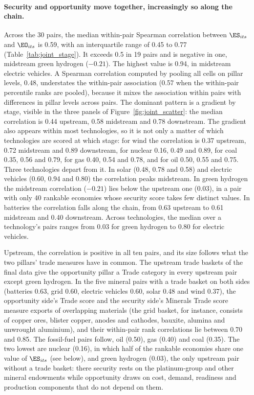 \paragraph{Security and opportunity move together, increasingly so along the chain.} Across the
30 pairs, the median within-pair Spearman correlation between $\ES_{its}$ and $\EO_{its}$ is
0.59, with an interquartile range of 0.45 to 0.77 (Table~\ref{tab:joint_stage}). It exceeds 0.5
in 19 pairs and is negative in one, midstream green hydrogen ($-0.21$). The highest value is
0.94, in midstream electric vehicles. A Spearman correlation computed by pooling all cells on
pillar levels, 0.48, understates the within-pair association (0.57 when the within-pair
percentile ranks are pooled), because it mixes the association within pairs with differences in
pillar levels across pairs. The dominant pattern is a gradient by stage, visible in the three
panels of Figure~\ref{fig:joint_scatter}: the median correlation is 0.44 upstream, 0.58
midstream and 0.78 downstream. The gradient also appears within most technologies, so it is not
only a matter of which technologies are scored at which stage: for wind the correlation is 0.37
upstream, 0.72 midstream and 0.89 downstream, for nuclear 0.16, 0.49 and 0.89, for coal 0.35,
0.56 and 0.79, for gas 0.40, 0.54 and 0.78, and for oil 0.50, 0.55 and 0.75. Three technologies
depart from it. In solar (0.48, 0.78 and 0.58) and electric vehicles (0.60, 0.94 and 0.80) the
correlation peaks midstream. In green hydrogen the midstream correlation ($-0.21$) lies below the
upstream one (0.03), in a pair with only 40 rankable economies whose security score takes few
distinct values. In batteries the correlation falls along the chain, from 0.63 upstream to 0.61
midstream and 0.40 downstream. Across technologies, the median over a technology's pairs ranges
from 0.03 for green hydrogen to 0.80 for electric vehicles.

Upstream, the correlation is positive in all ten pairs, and its size follows what the two
pillars' trade measures have in common. The upstream trade baskets of the final data give the
opportunity pillar a Trade category in every upstream pair except green hydrogen. In the five
mineral pairs with a trade basket on both sides (batteries 0.63, grid 0.60, electric vehicles
0.60, solar 0.48 and wind 0.37), the opportunity side's Trade score and the security side's Minerals Trade score
measure exports of overlapping materials (the grid basket, for instance, consists of copper ores,
blister copper, anodes and cathodes, bauxite, alumina and unwrought aluminium), and their
within-pair rank correlations lie between 0.70 and 0.85. The fossil-fuel pairs follow, oil
(0.50), gas (0.40) and coal (0.35). The two lowest are nuclear (0.16), in which half of the
rankable economies share one value of $\ES_{its}$ (see below), and green hydrogen (0.03), the
only upstream pair without a trade basket: there security rests on the platinum-group and other
mineral endowments while opportunity draws on cost, demand, readiness and production components
that do not depend on them.

